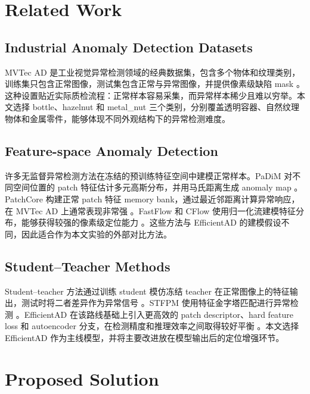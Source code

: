 \documentclass[letterpaper]{article}
\begin{document}
\section{Related Work}

\subsection{Industrial Anomaly Detection Datasets}

MVTec AD 是工业视觉异常检测领域的经典数据集，包含多个物体和纹理类别，训练集只包含正常图像，测试集包含正常与异常图像，并提供像素级缺陷 mask \citep{bergmann2019mvtec,bergmann2021mvtec}。这种设置贴近实际质检流程：正常样本容易采集，而异常样本稀少且难以穷举。本文选择 bottle、hazelnut 和 metal\_nut 三个类别，分别覆盖透明容器、自然纹理物体和金属零件，能够体现不同外观结构下的异常检测难度。

\subsection{Feature-space Anomaly Detection}

许多无监督异常检测方法在冻结的预训练特征空间中建模正常样本。PaDiM 对不同空间位置的 patch 特征估计多元高斯分布，并用马氏距离生成 anomaly map \citep{defard2021padim}。PatchCore 构建正常 patch 特征 memory bank，通过最近邻距离计算异常响应，在 MVTec AD 上通常表现非常强 \citep{roth2022patchcore}。FastFlow 和 CFlow 使用归一化流建模特征分布，能够获得较强的像素级定位能力 \citep{yu2021fastflow,gudovskiy2022cflow}。这些方法与 EfficientAD 的建模假设不同，因此适合作为本文实验的外部对比方法。

\subsection{Student--Teacher Methods}

Student--teacher 方法通过训练 student 模仿冻结 teacher 在正常图像上的特征输出，测试时将二者差异作为异常信号 \citep{bergmann2020uninformed,wang2021studentteacher}。STFPM 使用特征金字塔匹配进行异常检测 \citep{wang2021studentteacher}。EfficientAD 在该路线基础上引入更高效的 patch descriptor、hard feature loss 和 autoencoder 分支，在检测精度和推理效率之间取得较好平衡 \citep{batzner2024efficientad}。本文选择 EfficientAD 作为主线模型，并将主要改进放在模型输出后的定位增强环节。

\section{Proposed Solution}
\end{document}
